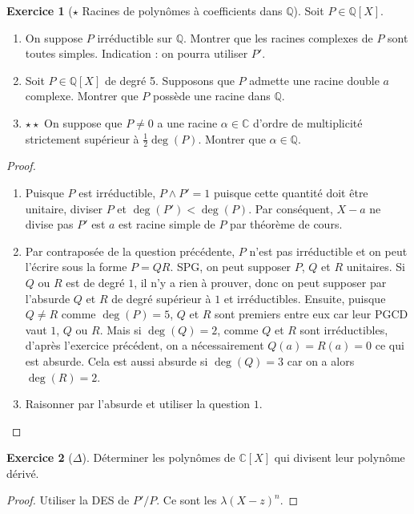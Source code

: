 \documentclass[french]{book}
\newcommand{\Q}{\mathbb{Q}}
\newcommand{\C}{\mathbb{C}}
\theoremstyle{definition}
\newtheorem{ex}{Exercice}[chapter]
\theoremstyle{theorem}
\theoremstyle{remark}
\begin{document}
\begin{ex}[$\star$ Racines de polynômes à coefficients dans $\Q$]
	Soit $P\in\Q[X]$.
	\begin{enumerate}
		\item On suppose $P$ irréductible sur $\Q$. Montrer que les racines complexes de $P$ sont toutes simples. Indication : on pourra utiliser $P'$.
		\item Soit $P\in\Q[X]$ de degré 5. Supposons que $P$ admette une racine double $a$ complexe. Montrer que $P$ possède une racine dans $\Q$.
		\item $\star\star$ On suppose que $P\ne 0$ a une racine $\alpha\in\C$ d'ordre de multiplicité strictement supérieur à $\displaystyle\frac12\deg(P)$. Montrer que $\alpha\in\Q$.
	\end{enumerate}
\end{ex}

\begin{proof}
	\begin{enumerate}
		\item Puisque $P$ est irréductible, $P\wedge P'=1$ puisque cette quantité doit être unitaire, diviser $P$ et $\deg(P')<\deg(P)$. Par conséquent, $X-a$ ne divise pas $P'$ est $a$ est racine simple de $P$ par théorème de cours.
		\item Par contraposée de la question précédente, $P$ n'est pas irréductible et on peut l'écrire sous la forme $P=QR$. SPG, on peut supposer $P$, $Q$ et $R$ unitaires. Si $Q$ ou $R$ est de degré $1$, il n'y a rien à prouver, donc on peut supposer par l'absurde $Q$ et $R$ de degré supérieur à $1$ et irréductibles. Ensuite, puisque $Q\ne R$ comme $\deg(P)=5$, $Q$ et $R$ sont premiers entre eux car leur PGCD vaut $1$, $Q$ ou $R$. Mais si $\deg(Q)=2$, comme $Q$ et $R$ sont irréductibles, d'après l'exercice précédent, on a nécessairement $Q(a)=R(a)=0$ ce qui est absurde. Cela est aussi absurde si $\deg(Q)=3$ car on a alors $\deg(R)=2$.
		\item Raisonner par l'absurde et utiliser la question $1$.
	\end{enumerate}
\end{proof}

\begin{ex}[$\Delta$]
	Déterminer les polynômes de $\C[X]$ qui divisent leur polynôme dérivé.
\end{ex}

\begin{proof}
	Utiliser la DES de $P'/P$. Ce sont les $\lambda(X-z)^n$.
\end{proof}
\end{document}
